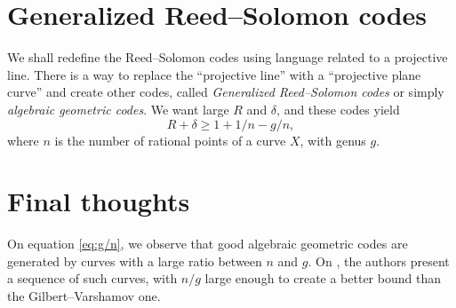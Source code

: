 \documentclass[11pt, letterpaper]{amsart}
\theoremstyle{definition}
\begin{document}
\section{Generalized Reed--Solomon codes} \label{s:grs}
We shall redefine the Reed--Solomon codes using language related to a projective line. There is a way to replace the ``projective line'' with a ``projective plane curve'' and create other codes, called \emph{Generalized Reed--Solomon codes} or simply \emph{algebraic geometric codes}. We want large $R$ and $\delta$, and these codes yield \begin{equation}\label{eq:g/n} R + \delta \ge 1 + 1/n - g/n,\end{equation} where $n$ is the number of rational points of a curve $X$, with genus $g$.

\section{Final thoughts} \label{s:tvz} On equation \eqref{eq:g/n}, we observe that good algebraic geometric codes are generated by curves with a large ratio between $n$ and $g$. On \cite{TVZ82}, the authors present a sequence of such curves, with $n/g$ large enough to create a better bound than the Gilbert--Varshamov one.

\printbibliography
\end{document}
